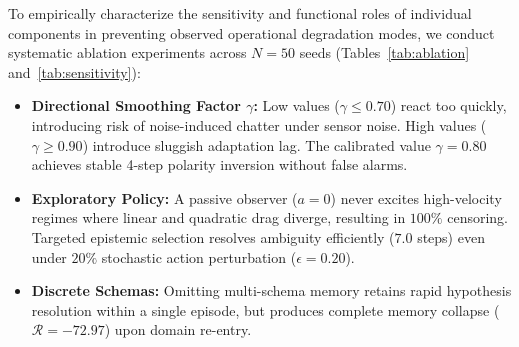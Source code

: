 \documentclass[preprint,12pt]{elsarticle}
\begin{document}
To empirically characterize the sensitivity and functional roles of individual components in preventing observed operational degradation modes, we conduct systematic ablation experiments across $N = 50$ seeds (Tables~\ref{tab:ablation} and~\ref{tab:sensitivity}):
\begin{itemize}
    \item \textbf{Directional Smoothing Factor $\gamma$:} Low values ($\gamma \le 0.70$) react too quickly, introducing risk of noise-induced chatter under sensor noise. High values ($\gamma \ge 0.90$) introduce sluggish adaptation lag. The calibrated value $\gamma = 0.80$ achieves stable 4-step polarity inversion without false alarms.
    \item \textbf{Exploratory Policy:} A passive observer ($a = 0$) never excites high-velocity regimes where linear and quadratic drag diverge, resulting in $100\%$ censoring. Targeted epistemic selection resolves ambiguity efficiently ($7.0$ steps) even under $20\%$ stochastic action perturbation ($\epsilon = 0.20$).
    \item \textbf{Discrete Schemas:} Omitting multi-schema memory retains rapid hypothesis resolution within a single episode, but produces complete memory collapse ($\mathcal{R} = -72.97$) upon domain re-entry.
\end{itemize}
\end{document}
